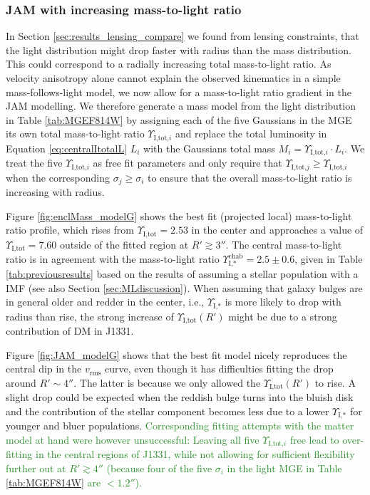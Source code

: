 \documentclass[useAMS,usenatbib]{mnras}
\newcommand{\NEW}[1]{\textcolor{ForestGreen}{#1}}
\begin{document}
\subsubsection{JAM with increasing mass-to-light ratio} \label{sec:results_JAM_SB_gradient}

In Section \ref{sec:results_lensing_compare} we found from lensing constraints, that the light distribution might drop faster with radius than the mass distribution. This could correspond to a radially increasing total mass-to-light ratio. As velocity anisotropy alone cannot explain the observed kinematics in a simple mass-follows-light model, we now allow for a mass-to-light ratio gradient in the JAM modelling. We therefore generate a mass model from the light distribution in Table \ref{tab:MGEF814W} by assigning each of the five Gaussians in the MGE its own total mass-to-light ratio $\Upsilon_{\text{I,tot,}i}$ and replace the total luminosity in Equation \eqref{eq:centralItotalL} $L_i$ with the Gaussians total mass $M_i = \Upsilon_{\text{I,tot,}i} \cdot L_i$. We treat the five $\Upsilon_{\text{I,tot,}i}$ as free fit parameters and only require that $\Upsilon_{\text{I,tot,}j} \geq \Upsilon_{\text{I,tot,}i}$ when the corresponding $\sigma_j \geq \sigma_i$ to ensure that the overall mass-to-light ratio is increasing with radius.

Figure \ref{fig:enclMass_modelG} shows the best fit (projected local) mass-to-light ratio profile, which rises from $\Upsilon_\text{I,tot} = 2.53$ in the center and approaches a value of $\Upsilon_\text{I,tot} = 7.60$ outside of the fitted region at $R'\gtrsim 3''$. The central mass-to-light ratio is in agreement with the mass-to-light ratio $\Upsilon_\text{I,*}^\text{chab} = 2.5 \pm 0.6$, given in Table \ref{tab:previousresults} based on the results of \citet{SWELLSI} assuming a stellar population with a \citet{Chabrier2003} IMF (see also Section \ref{sec:MLdiscussion}). When assuming that galaxy bulges are in general older and redder in the center, i.e., $\Upsilon_\text{I,*}$ is more likely to drop with radius than rise, the strong increase of $\Upsilon_\text{I,tot}(R')$ might be due to a strong contribution of DM in J1331.

Figure \ref{fig:JAM_modelG} shows that the best fit model nicely reproduces the central dip in the $v_\text{rms}$ curve, even though it has difficulties fitting the drop around $R' \sim 4''$. The latter is because we only allowed the $\Upsilon_\text{I,tot}(R')$ to rise. A slight drop could be expected when the reddish bulge turns into the bluish disk and the contribution of the stellar component becomes less due to a lower $\Upsilon_\text{I,*}$ for younger and bluer populations. \NEW{Corresponding fitting attempts with the matter model at hand were however unsuccessful: Leaving all five $\Upsilon_{\text{I,tot,}i}$ free lead to over-fitting in the central regions of J1331, while not allowing for sufficient flexibility further out at $R'\gtrsim4''$ (because four of the five $\sigma_i$ in the light MGE in Table \ref{tab:MGEF814W} are $< 1.2''$).}
\end{document}

